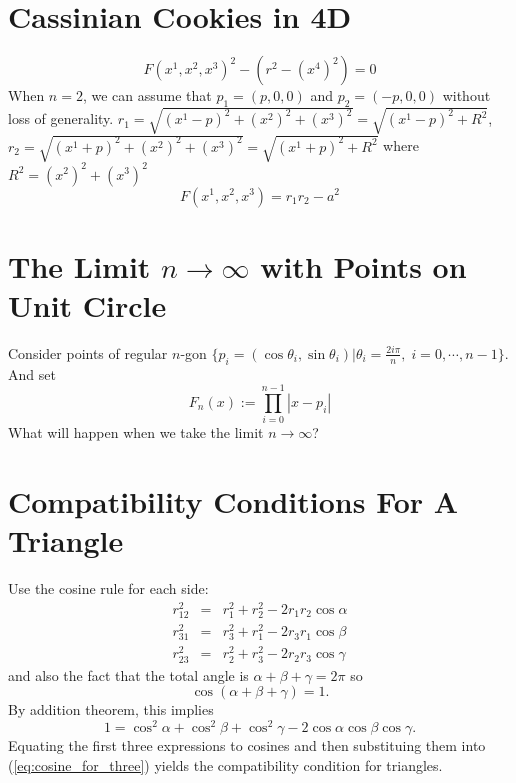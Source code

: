 \documentclass{article}
\begin{document}
\section{Cassinian Cookies in 4D}
\label{sec-3}
\begin{equation}
\label{}
F(x^1,x^2,x^3)^2 - ( r^2 - (x^4)^2) = 0 
\end{equation}
When $n=2$, we can assume that $p_1 = (p,0,0)$ and $p_2 = (-p,0,0)$ without loss of generality. 
$r_1= \sqrt{(x^1-p)^2 + (x^2)^2 + (x^3)^2}= \sqrt{(x^1-p)^2 + R^2}$, $r_2 = \sqrt{(x^1+p)^2 + (x^2)^2 +  (x^3)^2}= \sqrt{(x^1+p)^2 + R^2}$ where $R^2 = (x^2)^2 + (x^3)^2$
\begin{equation}
\label{}
F(x^1,x^2,x^3)= r_1r_2 -a^2
\end{equation}

\section{The Limit $n \to \infty$ with Points on Unit Circle}
\label{sec-4}
Consider points of regular $n$-gon $\{p_i=(\cos{\theta_i,\sin{\theta_i}})| \theta_i = \frac{2i\pi}{n}, \; i = 0,\cdots,n-1\}$. And set
\begin{equation}
\label{ }
F_n(x) := \prod_{i=0}^{n-1}|x-p_i|
\end{equation}
What will happen when we take the limit $n \to \infty$?
\appendix
\section{Compatibility Conditions For A Triangle}
\label{sec-5}
Use the cosine rule for each side:
\begin{eqnarray}
r_{12}^2 & = & r_1^2 + r_2^2 - 2r_1r_2\cos{\alpha} \\
r_{31}^2 & = & r_3^2 + r_1^2 - 2r_3r_1\cos{\beta} \\
r_{23}^2 & = & r_2^2 + r_3^2 - 2r_2r_3\cos{\gamma} 
\end{eqnarray}
and also the fact that the total angle is $\alpha + \beta +\gamma = 2\pi$ so
\begin{equation}
\label{ }
\cos{(\alpha + \beta +\gamma)} = 1.
\end{equation}
By addition theorem, this implies
\begin{equation}
\label{eq:cosine_for_three}
1= \cos^2{\alpha} + \cos^2{\beta} + \cos^2{\gamma} -2 \cos{\alpha} \cos{\beta} \cos{\gamma}.
\end{equation}
Equating the first three expressions to cosines and then substituing them into (\ref{eq:cosine_for_three}) yields the compatibility condition for triangles.
\end{document}
